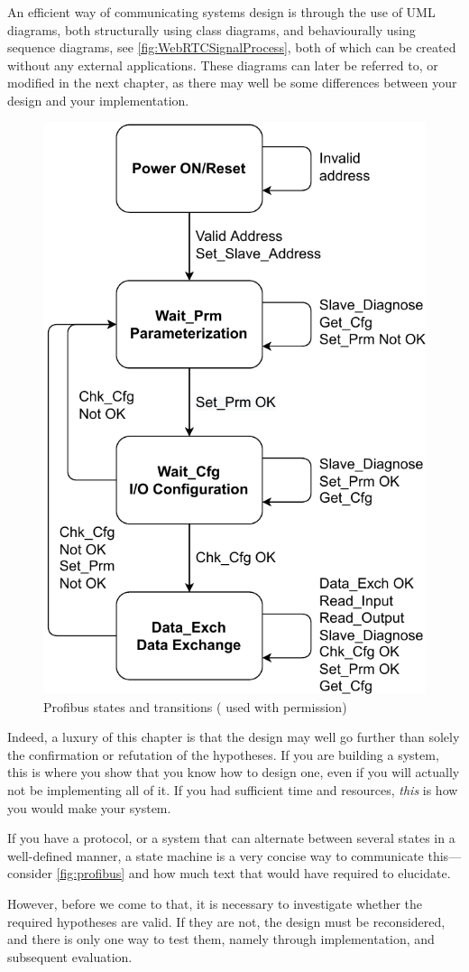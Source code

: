 An efficient way of communicating systems design is through the use of
\ac{UML} diagrams, both structurally using class diagrams, and behaviourally
using sequence diagrams, see \autoref{fig:WebRTCSignalProcess}, both of
which can be created without any external applications.  These diagrams can
later be referred to, or modified in the next chapter, as there may well be
some differences between your design and your implementation.


\begin{figure}
  \centering
  \includegraphics[width=.5\linewidth]{gfx/state_machine_profibus.pdf}
  \caption{Profibus states and transitions (\cite{Overgaard2022:2022} used with permission)}
  \label{fig:profibus}
\end{figure}

Indeed, a luxury of this chapter is that the design may well go further than
solely the confirmation or refutation of the hypotheses.  If you are
building a system, this is where you show that you know how to design one,
even if you will actually not be implementing all of it.  If you had
sufficient time and resources, \emph{this} is how you would make your
system.

If you have a protocol, or a system that can alternate between several
states in a well-defined manner, a state machine is a very concise way to
communicate this---consider \autoref{fig:profibus} and how much text that
would have required to elucidate.

However, before we come to that, it is necessary to investigate whether the
required hypotheses are valid. If they are not, the design must be
reconsidered, and there is only one way to test them, namely through
implementation, and subsequent evaluation.


